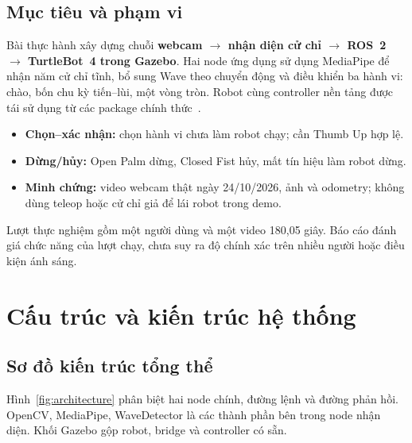 \documentclass[12pt,a4paper]{article}
\begin{document}
\subsection{Mục tiêu và phạm vi}
Bài thực hành xây dựng chuỗi \textbf{webcam $\rightarrow$ nhận diện cử chỉ $\rightarrow$ ROS~2 $\rightarrow$ TurtleBot~4 trong Gazebo}. Hai node ứng dụng sử dụng MediaPipe để nhận năm cử chỉ tĩnh, bổ sung Wave theo chuyển động và điều khiển ba hành vi: chào, bốn chu kỳ tiến--lùi, một vòng tròn. Robot cùng controller nền tảng được tái sử dụng từ các package chính thức~\cite{tb4,source}.
\begin{itemize}
\item \textbf{Chọn--xác nhận:} chọn hành vi chưa làm robot chạy; cần Thumb Up hợp lệ.
\item \textbf{Dừng/hủy:} Open Palm dừng, Closed Fist hủy, mất tín hiệu làm robot dừng.
\item \textbf{Minh chứng:} video webcam thật ngày 24/10/2026, ảnh và odometry; không dùng teleop hoặc cử chỉ giả để lái robot trong demo.
\end{itemize}
Lượt thực nghiệm gồm một người dùng và một video 180,05 giây. Báo cáo đánh giá chức năng của lượt chạy, chưa suy ra độ chính xác trên nhiều người hoặc điều kiện ánh sáng.

\section{Cấu trúc và kiến trúc hệ thống}
\subsection{Sơ đồ kiến trúc tổng thể}
Hình~\ref{fig:architecture} phân biệt hai node chính, đường lệnh và đường phản hồi. OpenCV, MediaPipe, WaveDetector là các thành phần bên trong node nhận diện. Khối Gazebo gộp robot, bridge và controller có sẵn.
\end{document}
